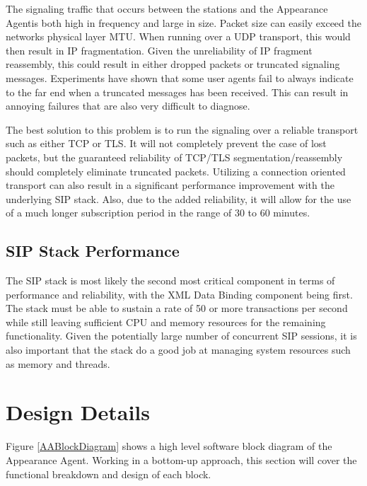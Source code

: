 \documentclass[twoside,11pt]{article}
\newcommand{\PAA}{Appearance Agent\space}
\begin{document}
  The signaling traffic that occurs between the stations and the \PAA is both high in frequency and
  large in size.  Packet size can easily exceed the networks physical layer MTU.  When running over
  a UDP transport, this would then result in IP fragmentation.  Given the unreliability of IP
  fragment reassembly, this could result in either dropped packets or truncated signaling messages. 
  Experiments have shown that some user agents fail to always indicate to the far end when a
  truncated messages has been received.  This can result in annoying failures that are also very
  difficult to diagnose.
  
  The best solution to this problem is to run the signaling over a reliable transport such as either
  TCP or TLS.  It will not completely prevent the case of lost packets, but the guaranteed
  reliability of TCP/TLS segmentation/reassembly should completely eliminate truncated packets.
  Utilizing a connection oriented transport can also result in a significant performance improvement
  with the underlying SIP stack.  Also, due to the added reliability, it will allow for the use of a
  much longer subscription period in the range of 30 to 60 minutes.
  
\subsection{SIP Stack Performance}
  The SIP stack is most likely the second most critical component in terms of performance and
  reliability, with the XML Data Binding component being first.  The stack must be able to sustain a
  rate of 50 or more transactions per second while still leaving sufficient CPU and memory resources
  for the remaining functionality.  Given the potentially large number of concurrent SIP sessions,
  it is also important that the stack do a good job at managing system resources such as memory and
  threads.


\section{Design Details}
Figure \ref{AABlockDiagram} shows a high level software block diagram of the \PAA. Working in a
bottom-up approach, this section will cover the functional breakdown and design of each block.
\end{document}
